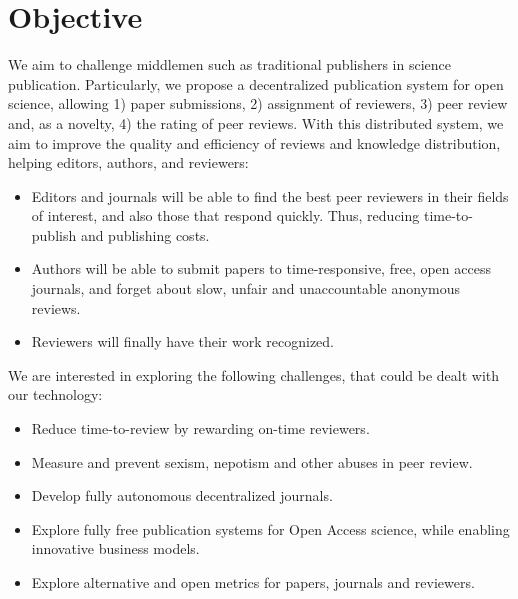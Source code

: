 \section{Objective}

We aim to challenge middlemen such as traditional publishers in science 
publication. Particularly, we propose a decentralized publication system for open
science, allowing 1) paper submissions, 2) assignment of reviewers, 3) peer
review and, as a novelty, 4) the rating of peer reviews. With this distributed
system, we aim to improve the quality and efficiency of reviews and knowledge
distribution, helping editors, authors, and reviewers:
\begin{itemize}
\item Editors and journals will be able to find the best peer reviewers in their
  fields of interest, and also those that respond quickly. Thus, reducing
  time-to-publish and publishing costs.
\item Authors will be able to submit papers to time-responsive, free, open
  access journals, and forget about slow, unfair and unaccountable anonymous
  reviews.
\item Reviewers will finally have their work recognized.
\end{itemize}

We are interested in exploring the following challenges, that could be dealt
with our technology:
\begin{itemize}
\item Reduce time-to-review by rewarding on-time reviewers.
\item Measure and prevent sexism, nepotism and other abuses in peer review.
\item Develop fully autonomous decentralized journals.
\item Explore fully free publication systems for Open Access science, while
  enabling innovative business models.
\item Explore alternative and open metrics for papers, journals and reviewers.
\end{itemize}

